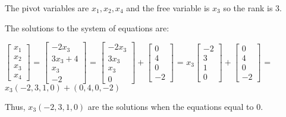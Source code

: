 \begin{tbox}
        \normalsize
        The pivot variables are $x_1,x_2,x_4$
        and the free variable is $x_3$ so the rank is 3.

        The solutions to the system of equations are:

        \hspace{0.5cm}
        \small
        $\begin{bmatrix}
            x_1 \\
            x_2 \\
            x_3 \\
            x_4
        \end{bmatrix}$ =
        $\begin{bmatrix}
            -2x_3 \\
            3x_3 + 4 \\
            x_3 \\
            -2
        \end{bmatrix}$ =
        $\begin{bmatrix}
            -2x_3 \\
            3x_3 \\
            x_3 \\
            0
        \end{bmatrix} +
        \begin{bmatrix}
            0 \\
            4 \\
            0 \\
            -2
        \end{bmatrix}$ =
        $x_3\begin{bmatrix}
            -2 \\
            3 \\
            1 \\
            0
        \end{bmatrix} +
        \begin{bmatrix}
            0 \\
            4 \\
            0 \\
            -2
        \end{bmatrix}$
        = $x_3(-2,3,1,0) + (0,4,0,-2)$

        \normalsize
        Thus, $x_3(-2,3,1,0)$
        are the solutions when the equations equal to 0.
    \end{tbox}

    \vspace{0.5cm}





